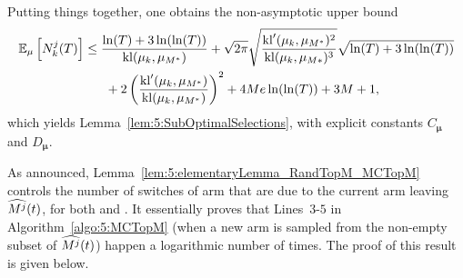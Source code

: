 \begin{smallproof}
  Putting things together, one obtains the non-asymptotic upper bound
  \begin{align}\label{eq:5:UBprecise}
    \mathbb{E}_{\mu}\left[N_k^j(T)\right]
    & \leq \frac{\ln(T) + 3 \ln(\ln(T))}{\mathrm{kl}(\mu_k,\mu_{M^*})} + \sqrt{2\pi} \sqrt{\frac{\mathrm{kl}'(\mu_k,\mu_{M^*})^2}{\mathrm{kl}(\mu_k,\mu_{M*})^3}}\sqrt{\ln(T) + 3\ln(\ln(T))}  \nonumber\\
    & \;\;\;\;\;\;+ 2\left(\frac{\mathrm{kl}'(\mu_k,\mu_{M^*})}{\mathrm{kl}(\mu_k,\mu_{M^*})}\right)^2 + 4Me \ln(\ln(T)) + 3M+1,
  \end{align}
  which yields Lemma~\ref{lem:5:SubOptimalSelections},
  with explicit constants $C_{\boldsymbol{\mu}}$ and $D_{\boldsymbol{\mu}}$.
\end{smallproof}






As announced, Lemma~\ref{lem:5:elementaryLemma_RandTopM_MCTopM} controls
the number of switches of arm that are due to the current arm leaving $\widehat{M^j}(t)$,
for both \RandTopM{} and \MCTopM{}. It essentially proves that Lines~$3$-$5$ in Algorithm~\ref{algo:5:MCTopM} (when a new arm is sampled from the non-empty subset of $\widehat{M^j}(t)$)
happen a logarithmic number of times. The proof of this result is given below.

